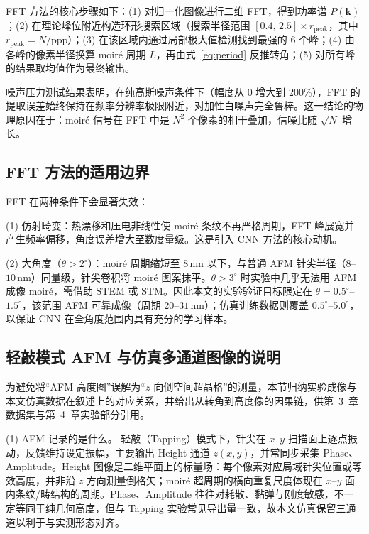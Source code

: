 \documentclass[supercite]{HustGraduPaper}
\begin{document}
FFT 方法的核心步骤如下：(1) 对归一化图像进行二维 FFT，得到功率谱 $P(\bm{k})$；(2) 在理论峰位附近构造环形搜索区域（搜索半径范围 $[0.4,\, 2.5] \times r_\mathrm{peak}$，其中 $r_\mathrm{peak} = N/\mathrm{ppp}$）；(3) 在该区域内通过局部极大值检测找到最强的 6 个峰；(4) 由各峰的像素半径换算 moiré 周期 $L$，再由式~\eqref{eq:period} 反推转角；(5) 对所有峰的结果取均值作为最终输出。

噪声压力测试结果表明，在纯高斯噪声条件下（幅度从 0 增大到 200\%），FFT 的提取误差始终保持在频率分辨率极限附近，对加性白噪声完全鲁棒。这一结论的物理原因在于：moiré 信号在 FFT 中是 $N^2$ 个像素的相干叠加，信噪比随 $\sqrt{N}$ 增长。

\subsection{FFT 方法的适用边界}

FFT 在两种条件下会显著失效：

(1) 仿射畸变：热漂移和压电非线性使 moiré 条纹不再严格周期，FFT 峰展宽并产生频率偏移，角度误差增大至数度量级。这是引入 CNN 方法的核心动机。

(2) 大角度（$\theta > 2^{\circ}$）：moiré 周期缩短至 $8\,\mathrm{nm}$ 以下，与普通 AFM 针尖半径（$8$--$10\,\mathrm{nm}$）同量级，针尖卷积将 moiré 图案抹平。$\theta > 3^{\circ}$ 时实验中几乎无法用 AFM 成像 moiré，需借助 STEM 或 STM。因此本文的实验验证目标限定在 $\theta = 0.5^{\circ}$--$1.5^{\circ}$，该范围 AFM 可靠成像（周期 $20$--$31\,\mathrm{nm}$）；仿真训练数据则覆盖 $0.5^{\circ}$--$5.0^{\circ}$，以保证 CNN 在全角度范围内具有充分的学习样本。

\subsection{轻敲模式 AFM 与仿真多通道图像的说明}
\label{subsec:afm_height_explain}

为避免将``AFM 高度图''误解为``$z$ 向倒空间超晶格''的测量，本节归纳实验成像与本文仿真数据在叙述上的对应关系，并给出从转角到高度像的因果链，供第~3~章数据集与第~4~章实验部分引用。

(1) AFM 记录的是什么。
轻敲（Tapping）模式下，针尖在 $x$--$y$ 扫描面上逐点振动，反馈维持设定振幅，主要输出 Height 通道 $z(x,y)$，并常同步采集 Phase、Amplitude。Height 图像是二维平面上的标量场：每个像素对应局域针尖位置或等效高度，并非沿 $z$ 方向测量倒格矢；moiré 超周期的横向重复尺度体现在 $x$--$y$ 面内条纹/畴结构的周期。Phase、Amplitude 往往对耗散、黏弹与刚度敏感，不一定等同于纯几何高度，但与 Tapping 实验常见导出量一致，故本文仿真保留三通道以利于与实测形态对齐。
\end{document}
